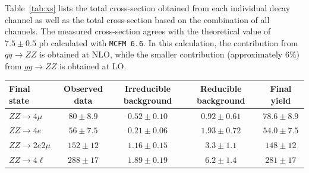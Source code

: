 Table~\ref{tab:xs} lists the total cross-section obtained from each individual decay channel as well as the
total cross-section based on the combination of all channels. The measured cross-section agrees
with the theoretical value of $7.5\pm 0.5$ pb calculated with \texttt{MCFM 6.6}. In this calculation, the
contribution from $q\bar{q} \to ZZ$ is obtained at NLO, while the smaller contribution (approximately
6\%) from $ gg \to ZZ$ is obtained at LO.

\begin{table}[htbH]
\begin{center}
\begin{tabular}{lcccc}
\hline Final state & Observed data& Irreducible background & Reducible background & Final yield\\
\hline $ZZ\to 4\mu $ & $ 80 \pm 8.9 $ & $ 0.52 \pm 0.10 $ & $ 0.92 \pm 0.61 $ & $ 78.6 \pm 8.9$ \\ 
$ZZ\to 4e $ & $56 \pm 7.5 $ & $ 0.21 \pm 0.06 $ & $ 1.93 \pm 0.72 $ & $ 54.0 \pm 7.5 $\\
$ZZ\to 2e2\mu$ & $ 152 \pm 12 $ & $ 1.16 \pm 0.15 $ & $ 3.3 \pm 1.1 $ & $ 148 \pm 12 $\\
\hline
\textbf{$ZZ\to 4\ell$} & $ 288 \pm 17 $ & $1.89 \pm 0.19 $ & $ 6.2 \pm 1.4 $ & $ 281 \pm17 $ \\ 
\hline 
\end{tabular}
\end{center}
\end{table}

